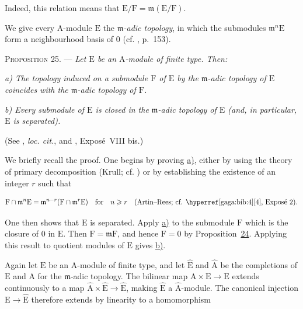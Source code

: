 Indeed, this relation means that $\mathrm{E}/\mathrm{F}=\mathfrak{m}(\mathrm{E}/\mathrm{F})$.

We give every $\mathrm{A}$-module $\mathrm{E}$ the \emph{$\mathfrak{m}$-adic topology}, in which
the submodules $\mathfrak{m}^n\mathrm{E}$ form a neighbourhood basis of $0$ (cf. ,
p.~153).

\textsc{Proposition 25}. --- \emph{Let $\mathrm{E}$ be an
$\mathrm{A}$-module of finite type. Then:}

\emph{a) The topology induced on a submodule
$\mathrm{F}$ of $\mathrm{E}$ by the $\mathfrak{m}$-adic topology of $\mathrm{E}$ coincides with the
$\mathfrak{m}$-adic topology of $\mathrm{F}$.}

\emph{b) Every submodule of $\mathrm{E}$ is closed in
the $\mathfrak{m}$-adic topology of $\mathrm{E}$ (and, in particular, $\mathrm{E}$ is
separated).}

(See , \emph{loc. cit.}, and , Exposé~VIII bis.)

We briefly recall the proof. One begins by proving
\hyperref[gaga:prop:25:item:a]{a)}, either by using the theory of primary
decomposition (Krull; cf. ) or by establishing the existence of an
integer $r$ such that

\begin{equation*}
\mathrm{F}\cap\mathfrak{m}^n\mathrm{E}
=\mathfrak{m}^{n-r}(\mathrm{F}\cap\mathfrak{m}^r\mathrm{E})
\quad\text{for}\quad n\geqslant r
\quad\text{(Artin--Rees; cf. \GAGACite{4}, Exposé~2).}
\end{equation*}

One then shows that $\mathrm{E}$ is separated. Apply
\hyperref[gaga:prop:25:item:a]{a)} to the submodule $\mathrm{F}$ which is the closure of
$0$ in $\mathrm{E}$. Then $\mathrm{F}=\mathfrak{m}\mathrm{F}$, and hence $\mathrm{F}=0$ by
Proposition~\hyperref[gaga:prop:24]{24}. Applying this result to quotient
modules of $\mathrm{E}$ gives \hyperref[gaga:prop:25:item:b]{b)}.

Again let $\mathrm{E}$ be an $\mathrm{A}$-module of finite type, and let $\widehat{\mathrm{E}}$ and
$\widehat{\mathrm{A}}$ be the completions of $\mathrm{E}$ and $\mathrm{A}$ for the $\mathfrak{m}$-adic
topology. The bilinear map $\mathrm{A}\times \mathrm{E}\to \mathrm{E}$ extends continuously to a map
$\widehat{\mathrm{A}}\times\widehat{\mathrm{E}}\to\widehat{\mathrm{E}}$, making $\widehat{\mathrm{E}}$ a
$\widehat{\mathrm{A}}$-module. The canonical injection $\mathrm{E}\to\widehat{\mathrm{E}}$ therefore
extends by linearity to a homomorphism

